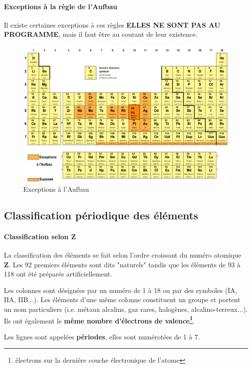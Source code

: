 \documentclass[10pt,a4paper]{book}
\begin{document}
\paragraph{Exceptions à la règle de l'Aufbau} Il existe certaines exceptions à ces règles \textbf{ELLES NE SONT PAS AU PROGRAMME}, mais il faut être au courant de leur existence.
\begin{figure}[h!]
\begin{center}
\includegraphics[scale=0.45]{./assets/aufbau_exceptions.png}
\end{center}
\caption{Exceptions à l'Aufbau}
\label{fig:exceptions}
\end{figure}
\newpage

\subsection{Classification périodique des éléments}

\paragraph{Classification selon Z} La classification des éléments se fait selon l'ordre croissant du numéro atomique \textbf{Z}. Les 92 premiers éléments sont dits "naturels" tandis que les éléments de 93 à 118 ont été préparés artificiellement. \par
Les colonnes sont désignées par un numéro de 1 à 18 ou par des symboles (IA, IIA, IIB...). Les éléments d'une même colonne constituent un groupe et portent un nom particuliers (i.e. métaux alcalins, gaz rares, halogènes, alcalino-terreux...). Ils ont également le \textbf{même nombre d'électrons de valence\footnote{électrons sur la dernière couche électronique de l'atome}}. \par 
Les lignes sont appelées \textbf{périodes}, elles sont numérotées de 1 à 7.
\end{document}
